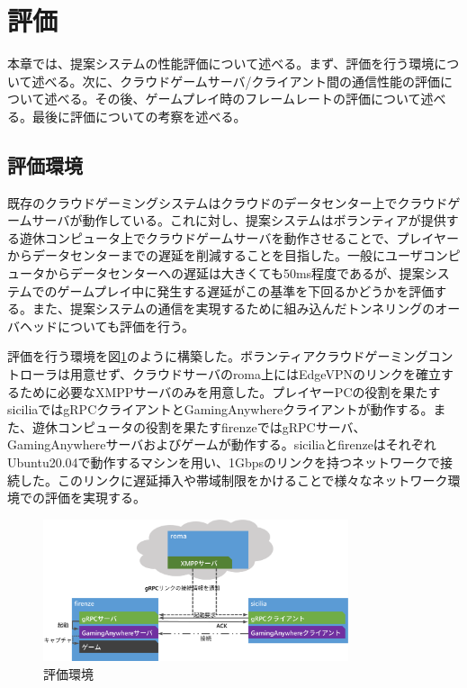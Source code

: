 \section{評価}
本章では、提案システムの性能評価について述べる。まず、評価を行う環境について述べる。次に、クラウドゲームサーバ/クライアント間の通信性能の評価について述べる。その後、ゲームプレイ時のフレームレートの評価について述べる。最後に評価についての考察を述べる。

\subsection{評価環境}
既存のクラウドゲーミングシステムはクラウドのデータセンター上でクラウドゲームサーバが動作している。これに対し、提案システムはボランティアが提供する遊休コンピュータ上でクラウドゲームサーバを動作させることで、プレイヤーからデータセンターまでの遅延を削減することを目指した。一般にユーザコンピュータからデータセンターへの遅延は大きくても50ms程度であるが、提案システムでのゲームプレイ中に発生する遅延がこの基準を下回るかどうかを評価する。また、提案システムの通信を実現するために組み込んだトンネリングのオーバヘッドについても評価を行う。

評価を行う環境を図\ref{fig:expenv}のように構築した。ボランティアクラウドゲーミングコントローラは用意せず、クラウドサーバのroma上にはEdgeVPNのリンクを確立するために必要なXMPPサーバのみを用意した。プレイヤーPCの役割を果たすsiciliaではgRPCクライアントとGamingAnywhereクライアントが動作する。また、遊休コンピュータの役割を果たすfirenzeではgRPCサーバ、GamingAnywhereサーバおよびゲームが動作する。siciliaとfirenzeはそれぞれUbuntu20.04で動作するマシンを用い、1Gbpsのリンクを持つネットワークで接続した。このリンクに遅延挿入や帯域制限をかけることで様々なネットワーク環境での評価を実現する。

\begin{figure}[t]
    \centering
    \includegraphics[width=0.8\textwidth,keepaspectratio,clip]{img/experimentalenvironment.eps}
    \caption{評価環境}
    \label{fig:expenv}
\end{figure}

